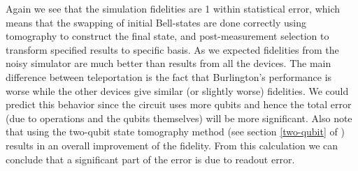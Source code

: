 Again we see that the simulation fidelities are 1 within
statistical error, which means that the swapping of initial Bell-states are done
correctly using tomography to construct the final state, and post-measurement
selection to transform specified results to specific basis. As we expected
fidelities from the noisy simulator are much better than results from all the
devices. The main difference between teleportation is the fact that Burlington's
performance is worse while the other devices give similar (or slightly worse)
fidelities. We could predict this behavior since the circuit uses more qubits
and hence the total error (due to operations and the qubits themselves) will be
more significant. Also note that using the two-qubit state tomography method
(see section \ref{two-qubit} of ) results in
an overall improvement of the fidelity. From this calculation we can conclude
that a significant part of the error is due to readout error. 

